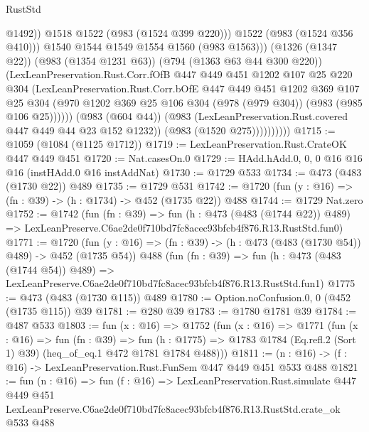 \begin{lexlean}{RustStd}
\begin{coremodule}
                                  @1492))
                              @1518
                              @1522
                              (@983 (@1524 @399 @220)))
                            @1522
                            (@983 (@1524 @356 @410)))
                          @1540
                          @1544
                          @1549
                          @1554
                          @1560
                          (@983 @1563)))
                      (@1326 (@1347 @22))
                      (@983 (@1354 @1231 @63))
                      (@794 (@1363 @63 @44 @300 @220))
                      (LexLeanPreservation.Rust.Corr.fOfB
                        @447
                        @449
                        @451
                        @1202
                        @107
                        @25
                        @220
                        @304
                        (LexLeanPreservation.Rust.Corr.bOfE
                          @447
                          @449
                          @451
                          @1202
                          @369
                          @107
                          @25
                          @304
                          (@970
                            @1202
                            @369
                            @25
                            @106
                            @304
                            (@978 (@979 @304))
                            (@983 (@985 @106 @25))))))
                    (@983 (@604 @44))
                    (@983 (LexLeanPreservation.Rust.covered @447 @449 @44 @23 @152 @1232))
                    (@983 (@1520 @275))))))))))
@1715 := @1059 (@1084 (@1125 @1712))
@1719 := LexLeanPreservation.Rust.CrateOK @447 @449 @451
@1720 := Nat.casesOn.{0}
@1729 := HAdd.hAdd.{0, 0, 0} @16 @16 @16 (instHAdd.{0} @16 instAddNat)
@1730 := @1729 @533
@1734 := @473 (@483 (@1730 @22)) @489
@1735 := @1729 @531
@1742 := @1720 (fun (y : @16) => (fn : @39) -> (h : @1734) -> @452 (@1735 @22)) @488
@1744 := @1729 Nat.zero
@1752 := @1742
    (fun (fn : @39) =>
    fun (h : @473 (@483 (@1744 @22)) @489) =>
    LexLeanPreserve.C6ae2de0f710bd7fc8acec93bfcb4f876.R13.RustStd.fun0)
@1771 := @1720
    (fun (y : @16) => (fn : @39) -> (h : @473 (@483 (@1730 @54)) @489) -> @452 (@1735 @54))
    @488
    (fun (fn : @39) =>
    fun (h : @473 (@483 (@1744 @54)) @489) =>
    LexLeanPreserve.C6ae2de0f710bd7fc8acec93bfcb4f876.R13.RustStd.fun1)
@1775 := @473 (@483 (@1730 @115)) @489
@1780 := Option.noConfusion.{0, 0} (@452 (@1735 @115)) @39
@1781 := @280 @39
@1783 := @1780 @1781 @39
@1784 := @487 @533
@1803 := fun (x : @16) =>
  @1752
    (fun (x : @16) =>
    @1771
      (fun (x : @16) =>
      fun (fn : @39) =>
      fun (h : @1775) =>
      @1783 @1784 (Eq.refl.{2} (Sort 1) @39) (heq_of_eq.{1} @472 @1781 @1784 @488)))
@1811 := (n : @16) -> (f : @16) -> LexLeanPreservation.Rust.FunSem @447 @449 @451 @533 @488
@1821 := fun (n : @16) =>
  fun (f : @16) =>
  LexLeanPreservation.Rust.simulate
    @447
    @449
    @451
    LexLeanPreserve.C6ae2de0f710bd7fc8acec93bfcb4f876.R13.RustStd.crate_ok
    @533
    @488
\end{coremodule}
\end{lexlean}
